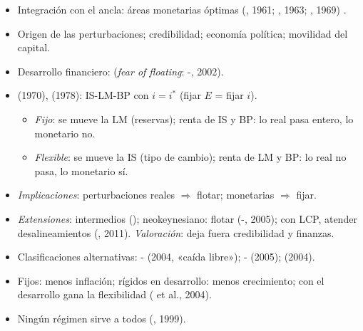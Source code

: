 \documentclass{article}
\begin{document}
\begin{columnas}
\begin{itemize}
\item Integración con el ancla: áreas monetarias óptimas (, 1961; , 1963; , 1969) .
\item Origen de las perturbaciones; credibilidad; economía política; movilidad del capital.
\item Desarrollo financiero:  (\emph{fear of floating}: -, 2002).
\end{itemize}
\begin{itemize}
\item {} (1970),  (1978): IS-LM-BP con $i=i^*$ (fijar $E$ = fijar $i$).
  \begin{itemize}
  \item \emph{Fijo}: se mueve la LM (reservas); renta de IS y BP: lo real pasa entero, lo monetario no.
  \item \emph{Flexible}: se mueve la IS (tipo de cambio); renta de LM y BP: lo real no pasa, lo monetario sí.
  \end{itemize}
\item \emph{Implicaciones}: perturbaciones reales $\Rightarrow$ flotar; monetarias $\Rightarrow$ fijar.
\end{itemize}
\begin{itemize}
\item \emph{Extensiones}: intermedios (); neokeynesiano: flotar (-, 2005); con LCP, atender desalineamientos (, 2011). \emph{Valoración}: deja fuera credibilidad y finanzas.
\end{itemize}
\begin{itemize}
\item Clasificaciones alternativas: - (2004, «caída libre»); - (2005);  (2004).
\item Fijos: menos inflación; rígidos en desarrollo: menos crecimiento; con el desarrollo gana la flexibilidad ( et al., 2004).
\item Ningún régimen sirve a todos (, 1999).
\end{itemize}


\end{columnas}
\end{document}
